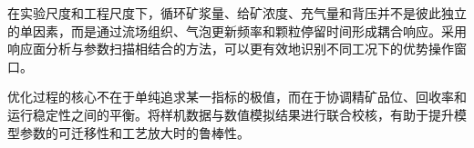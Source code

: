 \label{chap:optimization}


在实验尺度和工程尺度下，循环矿浆量、给矿浓度、充气量和背压并不是彼此独立的单因素，而是通过流场组织、气泡更新频率和颗粒停留时间形成耦合响应。采用响应面分析与参数扫描相结合的方法，可以更有效地识别不同工况下的优势操作窗口。

\vspace{0.4\baselineskip}

优化过程的核心不在于单纯追求某一指标的极值，而在于协调精矿品位、回收率和运行稳定性之间的平衡。将样机数据与数值模拟结果进行联合校核，有助于提升模型参数的可迁移性和工艺放大时的鲁棒性。
